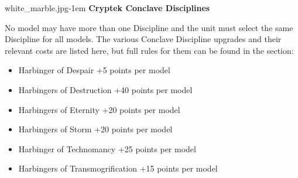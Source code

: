 \begin{minipage}[t]{0.72\textwidth}
	\vspace*{3em}
	\begin{imgminipage}{white_marble.jpg}{\textwidth-1em}
			\textbf{Cryptek Conclave Disciplines}
			
			No model may have more than one Discipline and the unit must select the same Discipline for all models. The various Conclave Discipline upgrades and their relevant costs are listed here, but full rules for them can be found in the  section:
			\begin{itemize}
				\item Harbinger of Despair \dotfill +5 points per model
				\item Harbingers of Destruction \dotfill +40 points per model
				\item Harbingers of Eternity \dotfill +20 points per model
				\item Harbingers of Storm \dotfill +20 points per model
				\item Harbinger of Technomancy \dotfill +25 points per model
				\item Harbingers of Transmogrification \dotfill +15 points per model
			\end{itemize}
	\end{imgminipage}
\end{minipage}



\newpage
\subsubsection[Arch-Cryptek]{}

